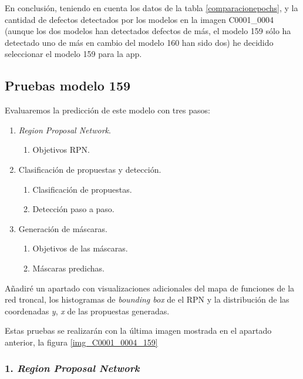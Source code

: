 En conclusión, teniendo en cuenta los datos de la tabla \ref{comparacionepochs}, y la cantidad de defectos detectados por los modelos en la imagen C0001\_0004 (aunque los dos modelos han detectados defectos de más, el modelo 159 sólo ha detectado uno de más en cambio del modelo 160 han sido dos) he decidido seleccionar el modelo 159 para la app.

\subsection{Pruebas modelo 159 \label{SectionPruebasModelo}}

Evaluaremos la predicción de este modelo con tres pasos:

\begin{enumerate}
    \tightlist
    \item \textit{Region Proposal Network}.
    \begin{enumerate}
        \item Objetivos RPN.
    \end{enumerate}
    \item Clasificación de propuestas y detección.
    \begin{enumerate}
        \item Clasificación de propuestas.
        \item Detección paso a paso.
    \end{enumerate}
    \item Generación de máscaras.
    \begin{enumerate}
        \item Objetivos de las máscaras.
        \item Máscaras predichas.
    \end{enumerate}
\end{enumerate}

Añadiré un apartado con visualizaciones adicionales del mapa de funciones de la red troncal, los histogramas de \textit{bounding box} de el RPN y la distribución de las coordenadas \textit{y}, \textit{x} de las propuestas generadas.

Estas pruebas se realizarán con la última imagen mostrada en el apartado anterior, la figura \ref{img_C0001_0004_159}

\subsubsection{1. \textit{Region Proposal Network}\label{1_Region_Proposal_Network}}

